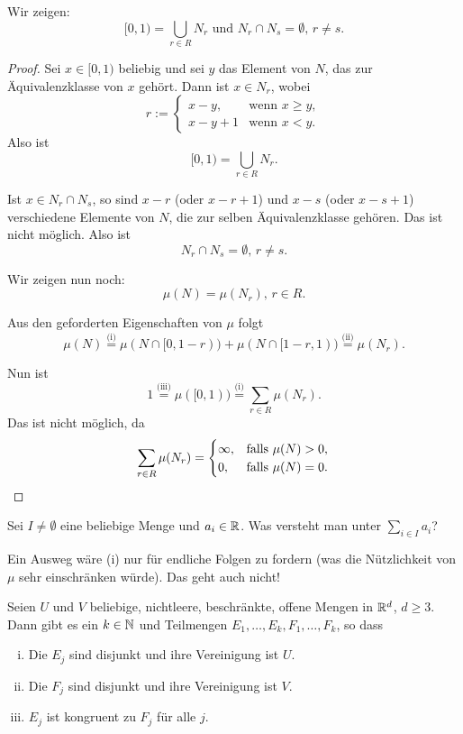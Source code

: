 Wir zeigen:
\[ [0,1) = \bigcup_{r \in R} N_r \text{ und } N_r \cap N_s = \emptyset,\, r \ne s. \]

\begin{proof}
 Sei $x \in [0,1)$ beliebig und sei $y$ das Element von $N$, das zur Äquivalenzklasse von $x$ gehört. Dann ist $x \in N_r$, wobei 
 \[ r := \begin{cases}
          x-y, & \text{wenn } x \ge y, \\
          x-y+1 & \text{wenn } x < y.
         \end{cases} \]
 Also ist
 \[ [0,1) = \bigcup_{r \in R} N_r. \]
 
 Ist $x \in N_r \cap N_s$, so sind $x-r$ (oder $x-r+1$) und $x-s$ (oder $x-s+1$) verschiedene Elemente von $N$, die zur selben Äquivalenzklasse gehören. Das ist nicht möglich. Also ist
 \[ N_r \cap N_s = \emptyset,\, r \ne s. \]

 Wir zeigen nun noch:
 \[ \mu( N ) = \mu(N_r),\, r \in R. \]

 Aus den geforderten Eigenschaften von $\mu$ folgt
 \[ \mu(N) \overset{\text{(i)}}{=} \mu( N \cap [0,1-r) ) + \mu( N \cap [1-r, 1) ) \overset{\text{(ii)}}{=} \mu(N_r). \] 
 
 Nun ist
 \[ 1 \overset{\text{(iii)}}{=} \mu( [0,1) ) \overset{\text{(i)}}{=} \sum_{r \in R} \mu( N_r ). \]
 Das ist nicht möglich, da
 \[ \sum_{r \in R} \mu( N_r ) = 
   \begin{cases}
    \infty, & \text{falls } \mu(N) > 0, \\
    0, & \text{falls } \mu(N) = 0.
   \end{cases} \qedhere \]
\end{proof}

Sei $I \ne \emptyset$ eine beliebige Menge und $a_i \in \mathbb{R}$. Was versteht man unter $\sum_{i \in I} a_i$?

Ein Ausweg wäre (i) nur für endliche Folgen zu fordern (was die Nützlichkeit von $\mu$ sehr einschränken würde). Das geht auch nicht!

\newpage

\begin{thm}
 Seien $U$ und $V$ beliebige, nichtleere, beschränkte, offene Mengen in $\mathbb{R}^d$, $d \ge 3$. Dann gibt es ein $k \in \mathbb{N}$ und Teilmengen $E_1, \ldots, E_k, F_1, \ldots, F_k$, so dass
 \begin{enumerate}[(i)]
  \item Die $E_j$ sind disjunkt und ihre Vereinigung ist $U$.
  \item Die $F_j$ sind disjunkt und ihre Vereinigung ist $V$.
  \item $E_j$ ist kongruent zu $F_j$ für alle $j$.
 \end{enumerate}
\end{thm}

